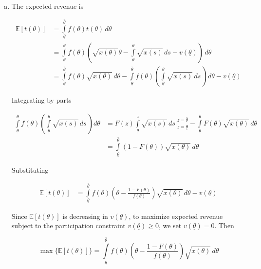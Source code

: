 \documentclass{article}
\begin{document}
\begin{enumerate}[(a)]
\item

The expected revenue is

\begin{align*}
\mathbb{E}[t(\theta)] &= \int \limits_{\underline{\theta}} ^{\bar{\theta}} f(\theta) t(\theta) \, d\theta \\
&= \int \limits_{\underline{\theta}} ^{\bar{\theta}} f(\theta) \left( \sqrt{x(\theta)}\theta -  \int \limits_{\underline{\theta}} ^\theta \sqrt{x(s)} \, ds - v(\underline{\theta})  \right) \, d\theta \\
&= \int \limits_{\underline{\theta}} ^{\bar{\theta}} f(\theta) \sqrt{x(\theta)} \, d\theta - \int \limits_{\underline{\theta}} ^{\bar{\theta}} f(\theta) \left( \int \limits_{\underline{\theta}} ^\theta \sqrt{x(s)} \, ds \, \right) d\theta - v(\underline{\theta})
\end{align*}

Integrating by parts

\begin{align*}
\int \limits_{\underline{\theta}} ^{\bar{\theta}} f(\theta) \left( \int \limits_{\underline{\theta}} ^\theta \sqrt{x(s)} \, ds \, \right) d\theta &= F(z) \int \limits_{\underline{\theta}}^z \sqrt{x(s)} \, ds \bigg\rvert_{z=\underline{\theta}}^{z=\bar{\theta}} - \int \limits_{\underline{\theta}} ^{\bar{\theta}} F(\theta) \sqrt{x(\theta)} \, d\theta \\
&= \int \limits_{\underline{\theta}} ^{\bar{\theta}} (1 - F(\theta)) \sqrt{x(\theta)} \, d\theta
\end{align*}

Substituting

\begin{align*}
\mathbb{E}[t(\theta)] &= \int \limits_{\underline{\theta}} ^{\bar{\theta}}  f(\theta) \left( \theta - \frac{1-F(\theta)}{f(\theta)} \right) \sqrt{x(\theta)} \, d\theta - v(\underline{\theta})
\end{align*}

Since $\mathbb{E}[t(\theta)]$ is decreasing in $v(\underline{\theta})$, to maximize expected revenue subject to the participation constraint $v(\underline{\theta}) \geq 0$, we set $v(\underline{\theta}) = 0$. Then

\begin{equation*}
\max \{ \mathbb{E}[t(\theta)] \} = \int \limits_{\underline{\theta}} ^{\bar{\theta}}  f(\theta) \left( \theta - \frac{1-F(\theta)}{f(\theta)} \right) \sqrt{x(\theta)} \, d\theta
\end{equation*}

\end{enumerate}
\end{document}
